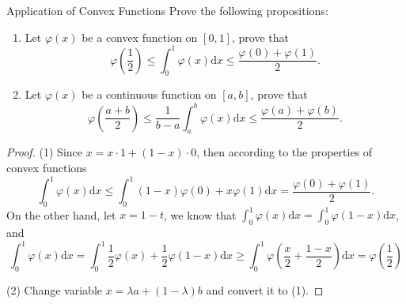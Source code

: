 \begin{example}{Application of Convex Functions}{}
  Prove the following propositions:
  \begin{enumerate}
  \item Let $\varphi(x)$ be a convex function on $[0, 1]$, prove that
    \begin{equation}
      \varphi (\frac{1}{2}) \leq \int_0^1\varphi(x)\mathrm{d} x \leq \frac{\varphi(0) + \varphi(1)}{2}.
    \end{equation}
  \item Let $\varphi(x)$ be a continuous function on $[a, b]$, prove that
    \begin{equation}
      \varphi (\frac{a+b}{2}) \leq \frac{1}{b-a} \int_a^b \varphi(x)\mathrm{d} x \leq \frac{\varphi(a) + \varphi(b)}{2}.
    \end{equation}
  \end{enumerate}
\end{example}

\begin{proof}
  (1) Since $x = x \cdot 1 + (1 - x) \cdot 0$, then according to the properties
  of convex functions
  \begin{equation}
    \int_0^1 \varphi(x)\mathrm{d} x \leq
    \int_0^1 (1-x)\varphi(0) + x\varphi(1)\mathrm{d} x = 
    \frac{\varphi(0) + \varphi(1)}{2}.
  \end{equation}
  On the other hand, let $x = 1 - t$,
  we know that $\int_0^1 \varphi(x)\mathrm{d} x = \int_0^1
  \varphi(1-x)\mathrm{d} x$, and
  \begin{equation}
    \int_0^1\varphi(x)\mathrm{d}x=\int_0^1\frac{1}{2}\varphi(x)+\frac{1}{2}\varphi(1-x)\mathrm{d}x\geq\int_0^1\varphi\left(\frac{x}{2}+\frac{1-x}{2}\right)\mathrm{d}x=\varphi\left(\frac{1}{2}\right)
  \end{equation}

  (2) Change variable $x = \lambda a + (1-\lambda)b$ and convert it to (1).
\end{proof}


